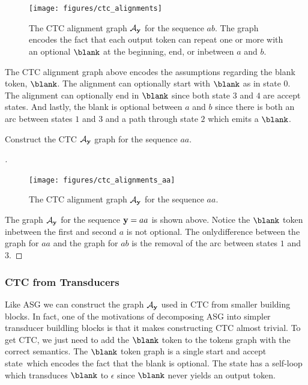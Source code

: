 \begin{figure}
    \centering
    \texttt{[image: figures/ctc\_alignments]}
    \caption{The CTC alignment graph $\mathcal{A}_{\bf y}$ for the sequence $ab$. The graph
    encodes the fact that each output token can repeat one or more with an
    optional $\blank$ at the beginning, end, or inbetween $a$ and $b$.}
    \label{fig:ctc_alignments}
\end{figure}

The CTC alignment graph above encodes the assumptions regarding the blank
token, $\blank$. The alignment can optionally start with $\blank$ as in state
$0$. The alignment can optionally end in $\blank$ since both state $3$ and $4$
are accept states. And lastly, the blank is optional between $a$ and $b$ since
there is both an arc between states $1$ and $3$ and a path through state $2$
which emits a $\blank$.

\begin{example}
Construct the CTC $\mathcal{A}_{\bf y}$ graph for the sequence $aa$.
\end{example}

\begin{proof}[\unskip\nopunct]

\begin{figure}
    \centering
    \texttt{[image: figures/ctc\_alignments\_aa]}
    \caption{The CTC alignment graph $\mathcal{A}_{\bf y}$ for the sequence $aa$.}
    \label{fig:ctc_alignments_aa}
\end{figure}

The graph $\mathcal{A}_{\bf y}$ for the sequence ${\bf y} = aa$ is shown above. Notice the
$\blank$ token inbetween the first and second $a$ is not optional. The
onlydifference between the graph for $aa$ and the graph for $ab$ is the removal
of the arc between states $1$ and $3$.
\end{proof}

\subsubsection{CTC from Transducers}

Like ASG we can construct the graph $\mathcal{A}_{\bf y}$ used in CTC from smaller building
blocks. In fact, one of the motivations of decomposing ASG into simpler
transducer buildling blocks is that it makes constructing CTC almost trivial.
To get CTC, we just need to add the $\blank$ token to the tokens graph with the
correct semantics. The $\blank$ token graph is a single start and accept
state which encodes the fact that the blank is optional. The state has a
self-loop which transduces $\blank$ to $\epsilon$ since $\blank$ never yields
an output token.

